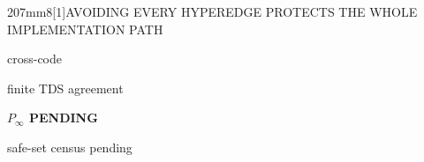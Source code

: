 \documentclass[final]{beamer}
\newcommand{\FigureSize}{\fontsize{24.7pt}{27.2pt}\selectfont}
\begin{document}
\begin{frame}[t]
\begin{minipage}[t][207mm][t]{448mm}
\begin{PosterPanel}{207mm}{8}{\scalebox{0.70}[1]{AVOIDING EVERY HYPEREDGE PROTECTS THE WHOLE IMPLEMENTATION PATH}}
    \noindent\begin{minipage}[c][24mm][c]{104mm}\centering
      {\fontsize{30pt}{32pt}\selectfont\bfseries\color{IASBlue}\CrossCodeAgreement\par}
      {\FigureSize\color{IASDarkText}cross-code\par}
    \end{minipage}\hfill
    \begin{minipage}[c][24mm][c]{104mm}\centering
      {\fontsize{30pt}{32pt}\selectfont\bfseries\color{IASBlue}\TDSAgreement\par}
      {\FigureSize\color{IASDarkText}finite TDS agreement\par}
    \end{minipage}\hfill
    \begin{minipage}[c][24mm][c]{104mm}\centering
      {\fontsize{28pt}{30pt}\selectfont\bfseries\color{IASGray}$P_{\infty}$ PENDING\par}
      {\FigureSize\color{IASDarkText}safe-set census pending\par}
    \end{minipage}
  \end{PosterPanel}
\end{minipage}\par
\vspace{3mm}


\end{frame}
\end{document}
